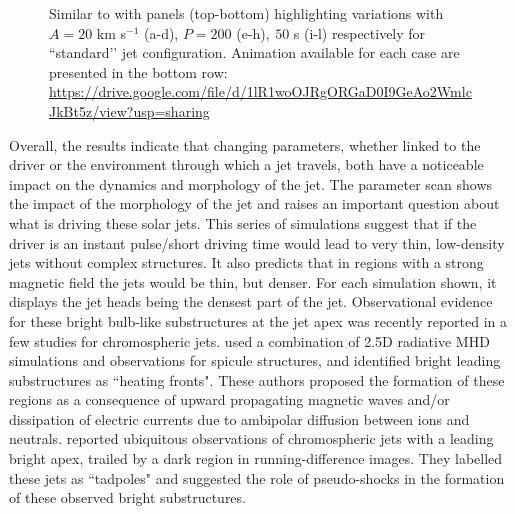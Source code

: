 \begin{figure}
\captionsetup[subfigure]{labelformat=empty}
\centering
{}
\caption{Similar to  with panels (top-bottom) highlighting variations with $A = 20$ km s$^{-1}$ (a-d), $P = 200$ (e-h)$,~50$ s (i-l) respectively for ``standard’’ jet configuration. Animation available for each case are presented in the bottom row: \url{https://drive.google.com/file/d/1lR1woOJRgORGaD0I9GeAo2WmlcJkBt5z/view?usp=sharing}}
\label{paramter_scan_two}
\end{figure}
Overall, the results indicate that changing parameters, whether linked to the driver or the environment through which a jet travels, both have a noticeable impact on the dynamics and morphology of the jet. The parameter scan shows the impact of the morphology of the jet and raises an important question about what is driving these solar jets. This series of simulations suggest that if the driver is an instant pulse/short driving time would lead to very thin, low-density jets without complex structures. It also predicts that in regions with a strong magnetic field the jets would be thin, but denser. For each simulation shown, it displays the jet heads being the densest part of the jet. Observational evidence for these bright bulb-like substructures at the jet apex was recently reported in a few studies \citep{depontieu2017, srivastava2018NatAs} for chromospheric jets. \citet{depontieu2017} used a combination of 2.5D radiative MHD simulations and observations for spicule structures, and identified bright leading substructures as ``heating fronts". These authors proposed the formation of these regions as a consequence of upward propagating magnetic waves and/or dissipation of electric currents due to ambipolar diffusion between ions and neutrals. \citet{srivastava2018NatAs} reported ubiquitous observations of chromospheric jets with a leading bright apex, trailed by a dark region in running-difference images. They labelled these jets as ``tadpoles" and suggested the role of pseudo-shocks in the formation of these observed bright substructures.
